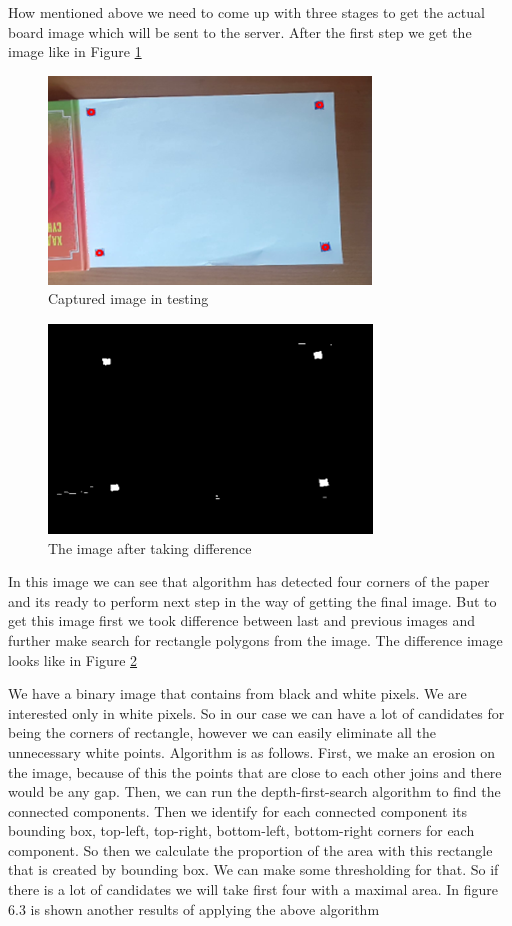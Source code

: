 How mentioned above we need to come up with three stages to get the actual board image which will be sent to the server. After the first step we get the image like in Figure \ref{fig:captured_image}

\begin{figure}[h]
    \centering
    \includegraphics{Figures/captured_image}
    \caption{Captured image in testing}
    \label{fig:captured_image}
\end{figure}

\begin{figure}[h]
    \centering
    \includegraphics{Figures/after_taking_difference}
    \caption{The image after taking difference}
    \label{fig:after_taking_difference}
\end{figure}


In this image we can see that algorithm has detected four corners of the paper and its ready to perform next step in the way of getting the final image. But to get this image first we took difference between last and previous images and further make search for rectangle polygons from the image. The difference image looks like in Figure \ref{fig:after_taking_difference}

We have a binary image that contains from black and white pixels. We are interested only in white pixels. So in our case we can have a lot of candidates for being the corners of rectangle, however we can easily eliminate all the unnecessary white points. Algorithm is as follows. First, we make an erosion on the image, because of this the points that are close to each other joins and there would be any gap. \cite{Ruchika} Then, we can run the depth-first-search algorithm to find the connected components. Then we identify for each connected component its bounding box, top-left, top-right, bottom-left, bottom-right corners for each component. So then we calculate the proportion of the area with this rectangle that is created by bounding box. We can make some thresholding for that. So if there is a lot of candidates we will take first four with a maximal area. In figure 6.3 is shown another results of applying the above algorithm

